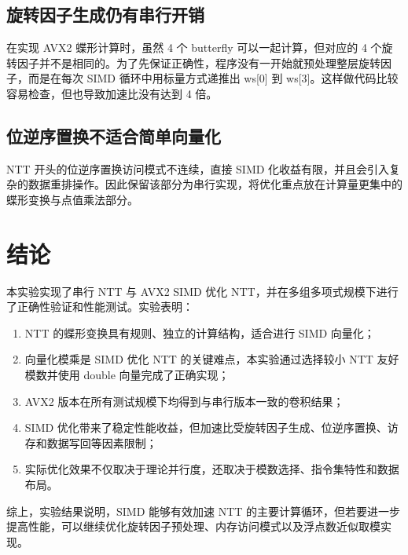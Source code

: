 \documentclass[a4paper,12pt]{ctexart}
\begin{document}
\subsection{旋转因子生成仍有串行开销}

在实现 AVX2 蝶形计算时，虽然 4 个 butterfly 可以一起计算，但对应的 4 个旋转因子并不是相同的。为了先保证正确性，程序没有一开始就预处理整层旋转因子，而是在每次 SIMD 循环中用标量方式递推出 ws[0] 到 ws[3]。这样做代码比较容易检查，但也导致加速比没有达到 4 倍。

\subsection{位逆序置换不适合简单向量化}

NTT 开头的位逆序置换访问模式不连续，直接 SIMD 化收益有限，并且会引入复杂的数据重排操作。因此保留该部分为串行实现，将优化重点放在计算量更集中的蝶形变换与点值乘法部分。

\section{结论}

本实验实现了串行 NTT 与 AVX2 SIMD 优化 NTT，并在多组多项式规模下进行了正确性验证和性能测试。实验表明：

\begin{enumerate}
  \item NTT 的蝶形变换具有规则、独立的计算结构，适合进行 SIMD 向量化；
  \item 向量化模乘是 SIMD 优化 NTT 的关键难点，本实验通过选择较小 NTT 友好模数并使用 double 向量完成了正确实现；
  \item AVX2 版本在所有测试规模下均得到与串行版本一致的卷积结果；
  \item SIMD 优化带来了稳定性能收益，但加速比受旋转因子生成、位逆序置换、访存和数据写回等因素限制；
  \item 实际优化效果不仅取决于理论并行度，还取决于模数选择、指令集特性和数据布局。
\end{enumerate}

综上，实验结果说明，SIMD 能够有效加速 NTT 的主要计算循环，但若要进一步提高性能，可以继续优化旋转因子预处理、内存访问模式以及浮点数近似取模实现。
\end{document}
